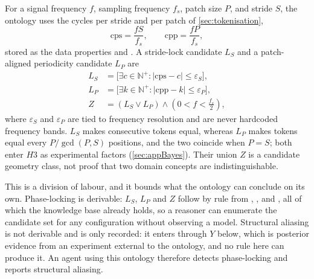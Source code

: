 For a signal frequency $f$, sampling frequency $f_s$, patch size $P$, and stride $S$, the ontology uses the cycles per stride and per patch of \autoref{sec:tokenisation},
\begin{equation*}
\mathrm{cps}=\frac{fS}{f_s},
\qquad
\mathrm{cpp}=\frac{fP}{f_s},
\end{equation*}
stored as the data properties  and . A stride-lock candidate $L_S$ and a patch-aligned periodicity candidate $L_P$ are
\begin{equation}
\begin{aligned}
L_S&=\big[\exists c\in\mathbb{N}^{+}:|\mathrm{cps}-c|\leq\varepsilon_S\big],\\
L_P&=\big[\exists k\in\mathbb{N}^{+}:|\mathrm{cpp}-k|\leq\varepsilon_P\big],\\
Z&=(L_S\vee L_P)\wedge\left(0<f<\frac{f_s}{2}\right),
\end{aligned}
\label{eq:locking-candidate}
\end{equation}
where $\varepsilon_S$ and $\varepsilon_P$ are tied to frequency resolution and are never hardcoded frequency bands. $L_S$ makes consecutive tokens equal, whereas $L_P$ makes tokens equal every $P/\gcd(P,S)$ positions, and the two coincide when $P=S$; both enter $H3$ as experimental factors (\autoref{sec:appBayes}). Their union $Z$ is a candidate geometry class, not proof that two domain concepts are indistinguishable.

This is a division of labour, and it bounds what the ontology can conclude on its own. Phase-locking is derivable: $L_S$, $L_P$ and $Z$ follow by rule from , ,  and , all of which the knowledge base already holds, so a reasoner can enumerate the candidate set for any configuration without observing a model. Structural aliasing is not derivable and is only recorded: it enters through $Y$ below, which is posterior evidence from an experiment external to the ontology, and no rule here can produce it. An agent using this ontology therefore detects phase-locking and reports structural aliasing.

